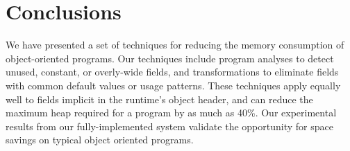 \documentclass[oribibl]{llncs}
\begin{document}

\section{Conclusions}
%
We have presented a set of techniques for reducing the memory
consumption of object-oriented programs.  Our techniques include
program analyses to detect unused, constant, or overly-wide fields,
and transformations to eliminate fields with common default values
or usage patterns.  These techniques apply equally well to
fields implicit in the runtime's object header, and can reduce the
maximum heap required for a program by as much as 40\%. 
Our experimental results from our fully-implemented system validate the
opportunity for space savings on typical object oriented programs.



%
\end{document}
